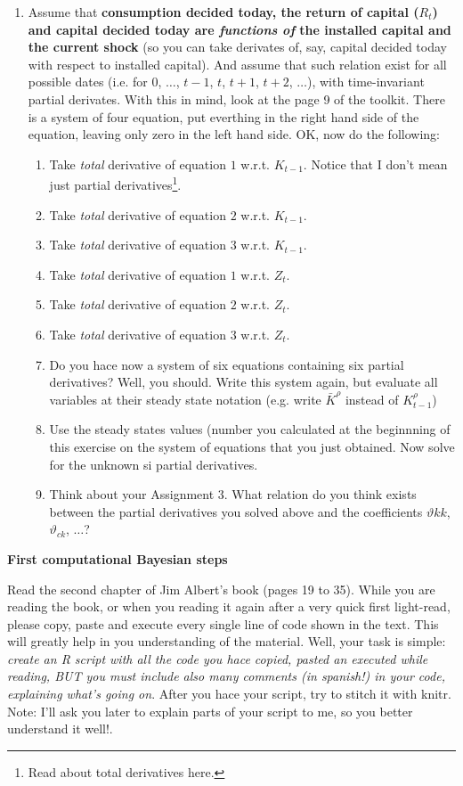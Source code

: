 \documentclass[11pt]{amsart}
\begin{document}
\begin{enumerate}
\item{Assume that \textbf{consumption decided today, the return of capital ($R_{t}$) and capital decided today are \emph{functions of} the installed capital and the current shock} (so you can take derivates of, say, capital decided today with respect to installed capital). And assume that such relation exist for all possible dates (i.e. for $0$, $\ldots$, $t-1$, $t$, $t+1$, $t+2$, $\ldots$), with time-invariant partial derivates. With this in mind, look at the page 9 of the toolkit. There is a system of four equation, put everthing in the right hand side of the equation, leaving only zero in the left hand side. OK, now do the following:}
  \begin{enumerate}
  \item{Take \emph{total} derivative of equation $1$ w.r.t. $K_{t-1}$. Notice that I don't mean just partial derivatives\footnote{Read about total derivatives here.}.}
  \item{Take \emph{total} derivative of equation $2$ w.r.t. $K_{t-1}$.}
  \item{Take \emph{total} derivative of equation $3$ w.r.t. $K_{t-1}$.}
  \item{Take \emph{total} derivative of equation $1$ w.r.t. $Z_{t}$.}
  \item{Take \emph{total} derivative of equation $2$ w.r.t. $Z_{t}$.}
  \item{Take \emph{total} derivative of equation $3$ w.r.t. $Z_{t}$.}
  \item{Do you hace now a system of six equations containing six partial derivatives? Well, you should. Write this system again, but evaluate all variables at their steady state notation (e.g. write $\bar K^{\rho}$ instead of $K_{t-1}^{\rho}$)}
  \item{Use the steady states values (number} you calculated at the beginnning of this exercise on the system of equations that you just obtained. Now solve for the unknown si partial derivatives.
  \item{Think about your Assignment 3. What relation do you think exists between the partial derivatives you solved above and the coefficients $\vartheta{kk}$, $\vartheta_{ck}$, $\ldots$?}
  \end{enumerate}
\end{enumerate}

\bigskip
{\LARGE \textbf{First computational Bayesian steps}}
\renewcommand{\labelenumi}{\arabic{enumi}.}

\medskip
Read the second chapter of Jim Albert's book (pages 19 to 35). While you are reading the book, or when you reading it again after a very quick first light-read, please copy, paste and execute every single line of code shown in the text. This will greatly help in you understanding of the material. Well, your task is simple: \emph{create an R script with all the code you hace copied, pasted an executed while reading, BUT you must include also many comments (in spanish!) in your code, explaining what's going on}. After you hace your script, try to stitch it with knitr. Note: I'll ask you later to explain parts of your script to me, so you better understand it well!.
\end{document}
